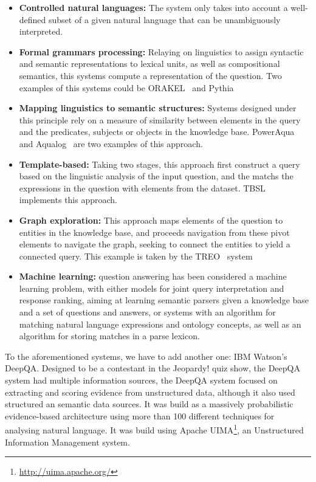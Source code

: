 \begin{itemize}
  \item \textbf{Controlled natural languages:} The system only takes into account a well-defined subset of a given natural language that can be unambiguously interpreted.
  \item \textbf{Formal grammars processing:} Relaying on linguistics to assign syntactic and semantic representations to lexical units, as well as compositional semantics, this systems compute a representation of the question. Two examples of this systems could be ORAKEL~\cite{cimiano2008towards} and Pythia~\cite{unger2011pythia}
  \item \textbf{Mapping linguistics to semantic structures:} Systems designed under this principle rely on a measure of similarity between elements in the query and the predicates, subjects or objects in the knowledge base. PowerAqua~\cite{lopez2011poweraqua} and Aqualog~\cite{lopez2007aqualog} are two examples of this approach.
  \item \textbf{Template-based:} Taking two stages, this approach first construct a query based on the linguistic analysis of the input question, and the matchs the expressions in the question with elements from the dataset. TBSL~\cite{unger2012template} implements this approach.
  \item \textbf{Graph exploration:} This approach maps elements of the question to entities in the knowledge base, and proceeds navigation from these pivot elements to navigate the graph, seeking to connect the entities to yield a connected query. This example is taken by the TREO~\cite{freitas2011querying} system
  \item \textbf{Machine learning:} question answering has been considered a machine learning problem, with either models for joint query interpretation and response ranking, aiming at learning semantic parsers given a knowledge base and a set of questions and answers, or systems with an algorithm for matching natural language expressions and ontology concepts, as well as an algorithm for storing matches in a parse lexicon.
\end{itemize}


To the aforementioned systems, we have to add another one: IBM Watson's DeepQA. Designed to be a contestant in the Jeopardy! quiz show, the DeepQA system had multiple information sources, the DeepQA system focused on extracting and scoring evidence from unstructured data, although it also used structured an semantic data sources. It was build as a massively probabilistic evidence-based architecture using more than 100 different techniques for analysing natural language. It was build using Apache UIMA\footnote{\url{http://uima.apache.org/}}, an Unstructured Information Management system.

